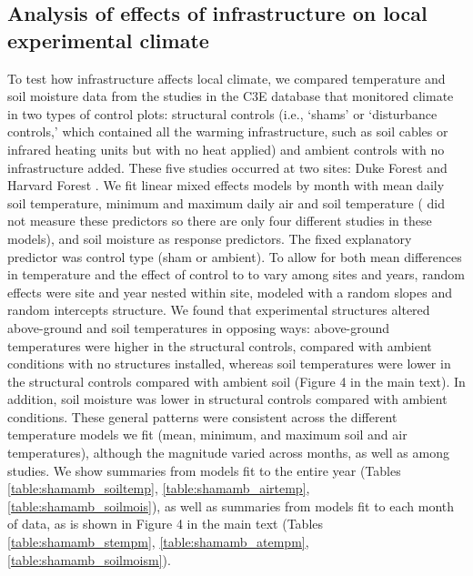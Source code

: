 \documentclass{article}
\begin{document}
\subsection* {Analysis of effects of infrastructure on local experimental climate}
To test how infrastructure affects local climate, we compared temperature and soil moisture data from the studies in the C3E database that monitored climate in two types of control plots: structural controls (i.e., `shams' or `disturbance controls,'
which contained all the warming infrastructure, such as soil cables or infrared heating units but with no heat
applied) and ambient controls with no infrastructure added. These five studies occurred at two sites: Duke Forest and Harvard Forest \citep{farnsworth1995,clark2014a,marchin2015,pelini2011}. We fit linear mixed effects models by month with mean daily soil temperature, minimum and maximum daily air and soil temperature (\citet{farnsworth1995} did not measure these predictors so there are only four different studies in these models), and soil moisture as response predictors. The fixed explanatory predictor was control type (sham or ambient). To allow for both mean differences in temperature and the effect of control to to vary among sites and years, random effects were site and year nested within site, modeled with a random slopes and random intercepts structure. 
We found that experimental structures altered above-ground and soil temperatures in opposing ways: above-ground temperatures were higher in the structural controls, compared with ambient conditions with no structures installed, whereas soil temperatures were lower in the structural controls compared with ambient soil (Figure 4 in the main text).  In addition, soil moisture was lower in
structural controls compared with ambient conditions. These general patterns were consistent across the different temperature models we fit (mean,
minimum, and maximum soil and air temperatures), although the magnitude varied across months, as well as among studies. We show summaries from models fit to the entire year (Tables \ref{table:shamamb_soiltemp}, \ref{table:shamamb_airtemp}, \ref{table:shamamb_soilmois}), as well as summaries from models fit to each month of data, as is shown in Figure 4 in the main text (Tables \ref{table:shamamb_stempm}, \ref{table:shamamb_atempm}, \ref{table:shamamb_soilmoism}).
\end{document}

